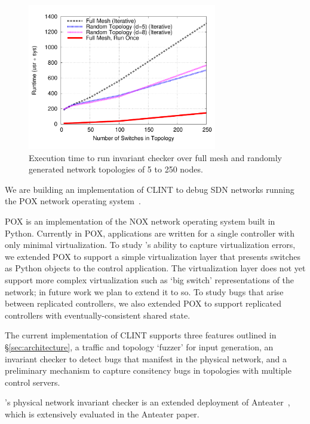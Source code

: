 
    \begin{figure}[t]
        \hspace{-10pt}
        \includegraphics[width=3.25in]{graph}
        \caption[]{\label{fig:anteatertime} Execution time to run invariant checker over full mesh and randomly generated network topologies of 5 to 250 nodes.} 
    \end{figure}

    We are building an implementation of CLINT to debug SDN networks running the POX network operating system~\cite{pox}.
    
    POX is an implementation of the NOX network operating system built in Python.
    Currently in POX, applications are written for a single controller with only minimal virtualization.
    To study \projectname{}'s ability to capture virtualization errors, we extended POX
    to support a simple virtualization layer that presents switches as Python objects to the control application.
    The virtualization layer does not yet support more complex virtualization such as `big switch' representations 
    of the network; in future work we plan to extend it to so.
    To study bugs that arise between replicated controllers, we also extended POX to support replicated controllers
    with eventually-consistent shared state.

    The current implementation of CLINT supports three features outlined in
    \S\ref{sec:architecture}, a traffic and topology `fuzzer' for input
    generation, an invariant checker to detect bugs that manifest in the
    physical network, and a preliminary mechanism to capture consitency bugs in topologies
    with multiple control servers.
    
    \projectname{}'s physical network invariant checker is an extended deployment of Anteater~\cite{anteater}, which is extensively evaluated in the Anteater paper.

